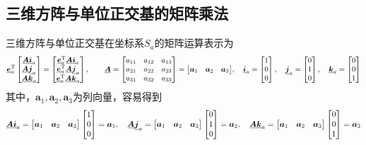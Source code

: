 \subsection{三维方阵与单位正交基的矩阵乘法}
\label{三维方阵与单位正交基的矩阵乘法}
三维方阵与单位正交基在坐标系$S_a$的矩阵运算表示为
\begin{equation*}
	\underline{\bm{e}}_a^{\text{T}} 
	\begin{bmatrix}
		\underline{\bm{A}} \underline{\bm{i}}_a \\
		\underline{\bm{A}} \underline{\bm{j}}_a \\
		\underline{\bm{A}} \underline{\bm{k}}_a
	\end{bmatrix}
	= 
	\begin{bmatrix}
		\underline{\bm{e}}_a^{\text{T}} \underline{\bm{A}} \underline{\bm{i}}_a \\
		\underline{\bm{e}}_a^{\text{T}} \underline{\bm{A}} \underline{\bm{j}}_a \\
		\underline{\bm{e}}_a^{\text{T}} \underline{\bm{A}} \underline{\bm{k}}_a
	\end{bmatrix}
	, \qquad
	\underline{\bm{A}} = 
	\begin{bmatrix}
		a_{11} & a_{12} & a_{13} \\
		a_{21} & a_{22} & a_{23} \\
		a_{31} & a_{32} & a_{33}
	\end{bmatrix}
	= \big[ \bm{a}_1 \quad \bm{a}_2 \quad \bm{a}_3 \big],
	\quad 
	\underline{\bm{i}}_a =
	\begin{bmatrix}
		1 \\
		0 \\
		0
	\end{bmatrix},
	\quad 
	\underline{\bm{j}}_a =
	\begin{bmatrix}
		0 \\
		1 \\
		0
	\end{bmatrix},
	\quad 
	\underline{\bm{k}}_a =
	\begin{bmatrix}
		0 \\
		0 \\
		1
	\end{bmatrix}
\end{equation*}
其中，$\bm{a}_1, \bm{a}_2, \bm{a}_3$为列向量，容易得到
\begin{equation*}
	\underline{\bm{A}} \underline{\bm{i}}_a = \big[ \bm{a}_1 \quad \bm{a}_2 \quad \bm{a}_3 \big]
	\begin{bmatrix}
		1 \\
		0 \\
		0
	\end{bmatrix}
	= \bm{a}_1,
	\quad 
	\underline{\bm{A}} \underline{\bm{j}}_a = \big[ \bm{a}_1 \quad \bm{a}_2 \quad \bm{a}_3 \big]
	\begin{bmatrix}
		0 \\
		1 \\
		0
	\end{bmatrix}
	= \bm{a}_2,
	\quad
	\underline{\bm{A}} \underline{\bm{k}}_a = \big[ \bm{a}_1 \quad \bm{a}_2 \quad \bm{a}_3 \big]
	\begin{bmatrix}
		0 \\
		0 \\
		1
	\end{bmatrix}
	= \bm{a}_3
\end{equation*}
